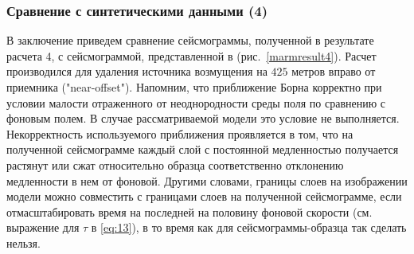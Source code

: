 \documentclass{article}
\newcommand  {\figref  } [1]     {рис.~\ref{#1}}
\newcommand  {\figrefp } [1]     {(\figref{#1})}
\begin{document}
\subsubsection{Сравнение с синтетическими данными (4)}
В заключение приведем сравнение сейсмограммы, полученной в результате расчета 4, с сейсмограммой, представленной в \cite{marmousi} \figrefp{marmresult4}. Расчет производился для удаления источника возмущения на $425$ метров вправо от приемника ("near-offset"). Напомним, что приближение Борна корректно при условии малости отраженного от неоднородности среды поля по сравнению с фоновым полем. В случае рассматриваемой модели это условие не выполняется. Некорректность используемого приближения проявляется в том, что на полученной сейсмограмме каждый слой с постоянной медленностью получается растянут или сжат относительно образца соответственно отклонению медленности в нем от фоновой. Другими словами, границы слоев на изображении модели можно совместить с границами слоев на полученной сейсмограмме, если отмасштабировать время на последней на половину фоновой скорости (см. выражение для $\tau$ в \eqref{eq:13}), в то время как для сейсмограммы-образца так сделать нельзя.
\end{document}
